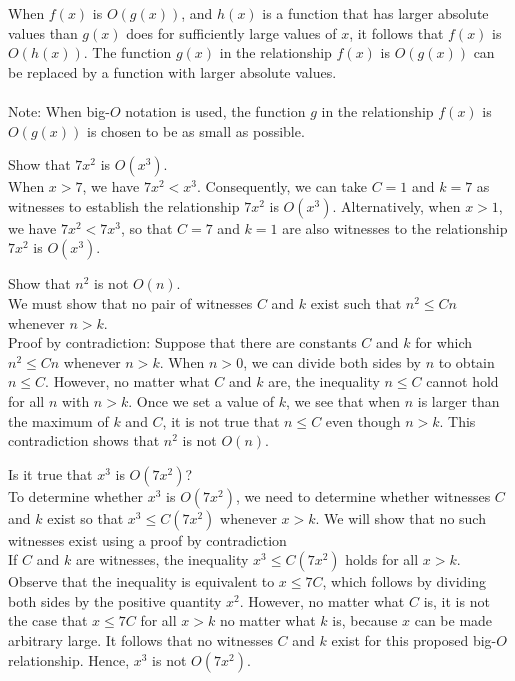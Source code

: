 \documentclass[12pt]{article}
\begin{document}
When $f(x)$ is $O(g(x))$, and $h(x)$ is a function that has larger absolute values than $g(x)$ does for sufficiently large values of $x$, it follows that $f(x)$ is $O(h(x))$. The function $g(x)$ in the relationship $f(x)$ is $O(g(x))$ can be replaced by a function with larger absolute values. \\~\\
Note: When big-$O$ notation is used, the function $g$ in the relationship $f(x)$ is $O(g(x))$ is chosen to be as small as possible. 
\begin{example} Show that $7x^2$ is $O(x^3)$. \\ 
When $x > 7$, we have $7x^2 < x^3$. Consequently, we can take $C = 1$ and $k = 7$ as witnesses to establish the relationship $7x^2$ is $O(x^3)$. Alternatively, when $x > 1$, we have $7x^2 < 7x^3$, so that $C = 7$ and $k = 1$ are also witnesses to the relationship $7x^2$ is $O(x^3)$. \end{example} 
\begin{example} Show that $n^2$ is not $O(n)$. \\ 
We must show that no pair of witnesses $C$ and $k$ exist such that $n^2 \leq Cn$ whenever $n > k$. \\Proof by contradiction: Suppose that there are constants $C$ and $k$ for which $n^2 \leq Cn$ whenever $n > k$. When $n > 0$, we can divide both sides by $n$ to obtain $n \leq C$. However, no matter what $C$ and $k$ are, the inequality $n \leq C$ cannot hold for all $n$ with $n > k$. Once we set a value of $k$, we see that when $n$ is larger than the maximum of $k$ and $C$, it is not true that $n \leq C$ even though $n > k$. This contradiction shows that $n^2$ is not $O(n)$. \end{example} 
\begin{example} Is it true that $x^3$ is $O(7x^2)$? \\ 
To determine whether $x^3$ is $O(7x^2)$, we need to determine whether witnesses $C$ and $k$ exist so that $x^3 \leq C(7x^2)$ whenever $x > k$. We will show that no such witnesses exist using a proof by contradiction \\ If $C$ and $k$ are witnesses, the inequality $x^3 \leq C(7x^2)$ holds for all $x > k$. Observe that the inequality is equivalent to $x \leq 7C$, which follows by dividing both sides by the positive quantity $x^2$. However, no matter what $C$ is, it is not the case that $x \leq 7C$ for all $x > k$ no matter what $k$ is, because $x$ can be made arbitrary large. It follows that no witnesses $C$ and $k$ exist for this proposed big-$O$ relationship. Hence, $x^3$ is not $O(7x^2)$. \end{example} 
\end{document}
